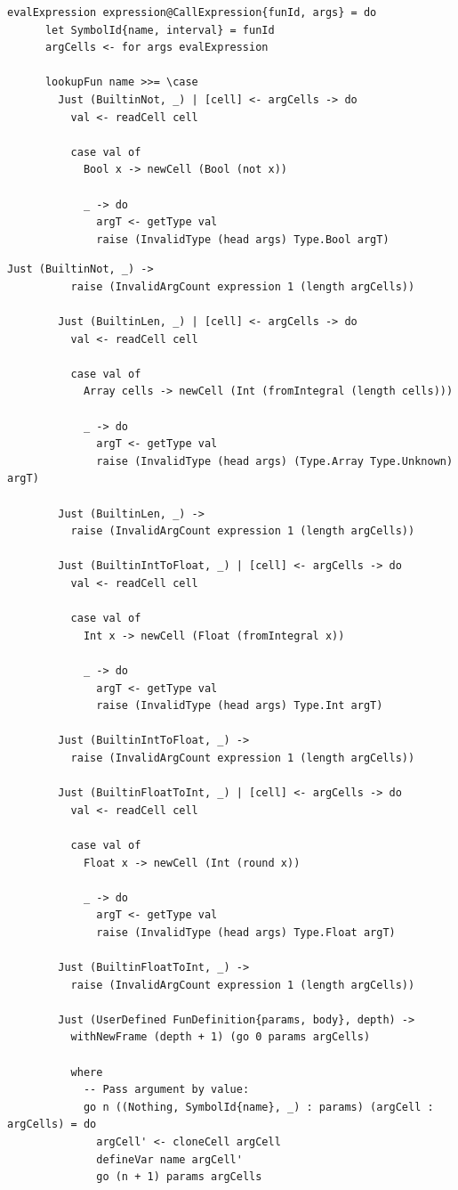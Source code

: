 \documentclass[UdineBachThesis,american,11pt]{PhdThesis}
\begin{document}
  \begin{Verbatim}[gobble=4,fontsize=\small]
    evalExpression expression@CallExpression{funId, args} = do
      let SymbolId{name, interval} = funId
      argCells <- for args evalExpression

      lookupFun name >>= \case
        Just (BuiltinNot, _) | [cell] <- argCells -> do
          val <- readCell cell

          case val of
            Bool x -> newCell (Bool (not x))

            _ -> do
              argT <- getType val
              raise (InvalidType (head args) Type.Bool argT)
  \end{Verbatim}

  \pagebreak

  \begin{Verbatim}[gobble=4,fontsize=\small]
        Just (BuiltinNot, _) ->
          raise (InvalidArgCount expression 1 (length argCells))

        Just (BuiltinLen, _) | [cell] <- argCells -> do
          val <- readCell cell

          case val of
            Array cells -> newCell (Int (fromIntegral (length cells)))

            _ -> do
              argT <- getType val
              raise (InvalidType (head args) (Type.Array Type.Unknown) argT)

        Just (BuiltinLen, _) ->
          raise (InvalidArgCount expression 1 (length argCells))

        Just (BuiltinIntToFloat, _) | [cell] <- argCells -> do
          val <- readCell cell

          case val of
            Int x -> newCell (Float (fromIntegral x))

            _ -> do
              argT <- getType val
              raise (InvalidType (head args) Type.Int argT)

        Just (BuiltinIntToFloat, _) ->
          raise (InvalidArgCount expression 1 (length argCells))

        Just (BuiltinFloatToInt, _) | [cell] <- argCells -> do
          val <- readCell cell

          case val of
            Float x -> newCell (Int (round x))

            _ -> do
              argT <- getType val
              raise (InvalidType (head args) Type.Float argT)

        Just (BuiltinFloatToInt, _) ->
          raise (InvalidArgCount expression 1 (length argCells))

        Just (UserDefined FunDefinition{params, body}, depth) ->
          withNewFrame (depth + 1) (go 0 params argCells)

          where
            -- Pass argument by value:
            go n ((Nothing, SymbolId{name}, _) : params) (argCell : argCells) = do
              argCell' <- cloneCell argCell
              defineVar name argCell'
              go (n + 1) params argCells
  \end{Verbatim}
\end{document}
